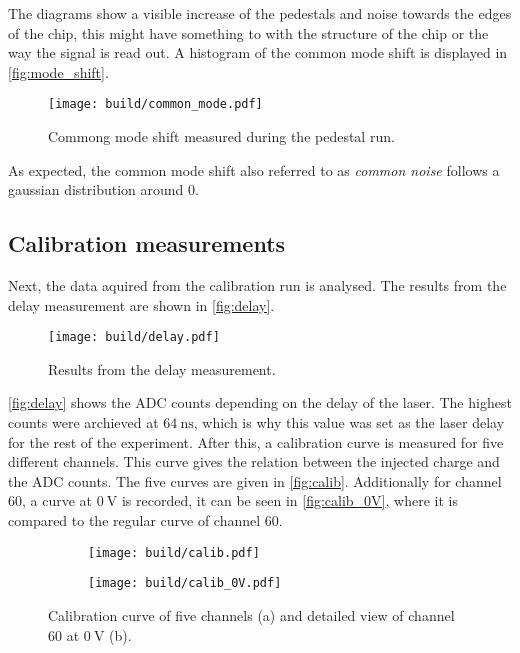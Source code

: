 The diagrams show a visible increase of the pedestals and noise towards the edges of the chip,
this might have something to with the structure of the chip or the way the signal is read out.
A histogram of the common mode shift is displayed in \autoref{fig:mode_shift}.

\begin{figure}[H]
  \centering
  \texttt{[image: build/common\_mode.pdf]}
  \caption{Commong mode shift measured during the pedestal run.}
  \label{fig:mode_shift}
\end{figure}

As expected, the common mode shift also referred to as \textit{common noise} follows a gaussian
distribution around $0$.

\subsection{Calibration measurements}

Next, the data aquired from the calibration run is analysed. The results from the delay measurement
are shown in \autoref{fig:delay}.

\begin{figure}[H]
  \centering
  \texttt{[image: build/delay.pdf]}
  \caption{Results from the delay measurement.}
  \label{fig:delay}
\end{figure}

\autoref{fig:delay} shows the ADC counts depending on the delay of the laser. The highest
counts were archieved at $\qty{64}{\nano\second}$, which is why this value was set as the
laser delay for the rest of the experiment.
After this, a calibration curve is measured for five different channels. This curve gives
the relation between the injected charge and the ADC counts. The five curves are given
in \autoref{fig:calib}. Additionally for channel $60$, a curve at $\qty{0}{\volt}$ is
recorded, it can be seen in \autoref{fig:calib_0V}, where it is compared to the regular
curve of channel $60$.

\begin{figure}[H]
  \centering
    \begin{subfigure}{0.45\textwidth}
      \texttt{[image: build/calib.pdf]}
      \caption{}
      \label{fig:calib}
    \end{subfigure}
    \begin{subfigure}{0.45\textwidth}
      \texttt{[image: build/calib\_0V.pdf]}
      \caption{}
      \label{fig:calib_0V}
    \end{subfigure} 
  \caption{Calibration curve of five channels (a) and detailed view of channel $60$ at $\qty{0}{\volt}$ (b).}
  \label{fig:calib_run}
\end{figure}

